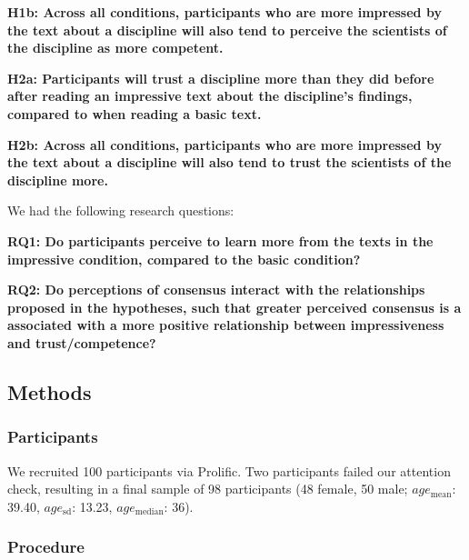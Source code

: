 \documentclass[
  doc,floatsintext]{apa6}
\begin{document}
\textbf{H1b: Across all conditions, participants who are more impressed by the text about a discipline will also tend to perceive the scientists of the discipline as more competent.}

\textbf{H2a: Participants will trust a discipline more than they did before after reading an impressive text about the discipline's findings, compared to when reading a basic text.}

\textbf{H2b: Across all conditions, participants who are more impressed by the text about a discipline will also tend to trust the scientists of the discipline more.}

We had the following research questions:

\textbf{RQ1: Do participants perceive to learn more from the texts in the impressive condition, compared to the basic condition?}

\textbf{RQ2: Do perceptions of consensus interact with the relationships proposed in the hypotheses, such that greater perceived consensus is a associated with a more positive relationship between impressiveness and trust/competence?}

\subsection{Methods}\label{methods}

\subsubsection{Participants}\label{participants}

We recruited 100 participants via Prolific. Two participants failed our attention check, resulting in a final sample of 98 participants (48 female, 50 male; \(age_\text{mean}\): 39.40, \(age_\text{sd}\): 13.23, \(age_\text{median}\): 36).

\subsubsection{Procedure}\label{procedure}
\end{document}
